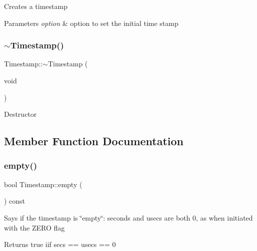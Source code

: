 Creates a timestamp 
\begin{DoxyParams}{Parameters}
{\em option} & option to set the initial time stamp \\
\hline
\end{DoxyParams}
\mbox{\label{classDUtils_1_1Timestamp_a06ea20fe67d9e7177818ba219ea3137f}} 
\subsubsection{\texorpdfstring{$\sim$\+Timestamp()}{~Timestamp()}}
{\footnotesize\ttfamily Timestamp\+::$\sim$\+Timestamp (\begin{DoxyParamCaption}\item[{void}]{ }\end{DoxyParamCaption})\hspace{0.3cm}{\ttfamily [virtual]}}

Destructor 

\subsection{Member Function Documentation}
\mbox{\label{classDUtils_1_1Timestamp_a0aaa878aee63c543dea866892c003a62}} 
\subsubsection{\texorpdfstring{empty()}{empty()}}
{\footnotesize\ttfamily bool Timestamp\+::empty (\begin{DoxyParamCaption}{ }\end{DoxyParamCaption}) const}

Says if the timestamp is \char`\"{}empty\char`\"{}\+: seconds and usecs are both 0, as when initiated with the Z\+E\+RO flag \begin{DoxyReturn}{Returns}
true iif secs == usecs == 0 
\end{DoxyReturn}
\mbox{\label{classDUtils_1_1Timestamp_ad2ce60eeec43f9fa86379ed8b269ab64}} 
